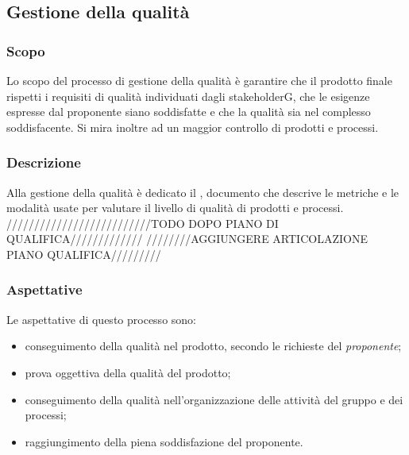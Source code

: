 \subsection{Gestione della qualità}
\subsubsection{Scopo}
Lo scopo del processo di gestione della qualità è garantire che il prodotto finale rispetti i requisiti di qualità individuati dagli stakeholderG, che le esigenze espresse dal proponente siano soddisfatte e che la qualità sia nel complesso soddisfacente. Si mira inoltre ad un maggior controllo di prodotti e processi.
\subsubsection{Descrizione}
Alla gestione della qualità è dedicato il \PdQ{}, documento che descrive le metriche e le modalità usate per valutare il livello di qualità di prodotti e processi.
//////////////////////////TODO DOPO PIANO DI QUALIFICA/////////////
////////AGGIUNGERE ARTICOLAZIONE PIANO QUALIFICA/////////
\subsubsection{Aspettative}
Le aspettative di questo processo sono:
\begin{itemize}
	\item conseguimento della qualità nel prodotto, secondo le richieste del \textit{proponente};
	\item prova oggettiva della qualità del prodotto;
	\item conseguimento della qualità nell'organizzazione delle attività del gruppo e dei processi;
	\item raggiungimento della piena soddisfazione del proponente.
\end{itemize}
